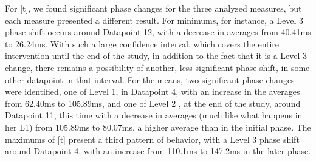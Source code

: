 For [t], we found significant phase changes for the three analyzed measures,
but each measure presented a different result. For minimums, for instance, a
Level 3 phase shift occurs around Datapoint 12, with a decrease in averages
from 40.41ms to 26.24ms. With such a large confidence interval, which covers
the entire intervention until the end of the study, in addition to the fact
that it is a Level 3 change, there remains a possibility of another, less
significant phase shift, in some other datapoint in that interval. For the
means, two significant phase changes were identified, one of Level 1, in
Datapoint 4, with an increase in the averages from 62.40ms to 105.89ms, and one
of Level 2 , at the end of the study, around Datapoint 11, this time with a
decrease in averages (much like what happens in her L1) from 105.89ms to
80.07ms, a higher average than in the initial phase. The maximums of [t]
present a third pattern of behavior, with a Level 3 phase shift around
Datapoint 4, with an increase from 110.1ms to 147.2ms in the later phase.


